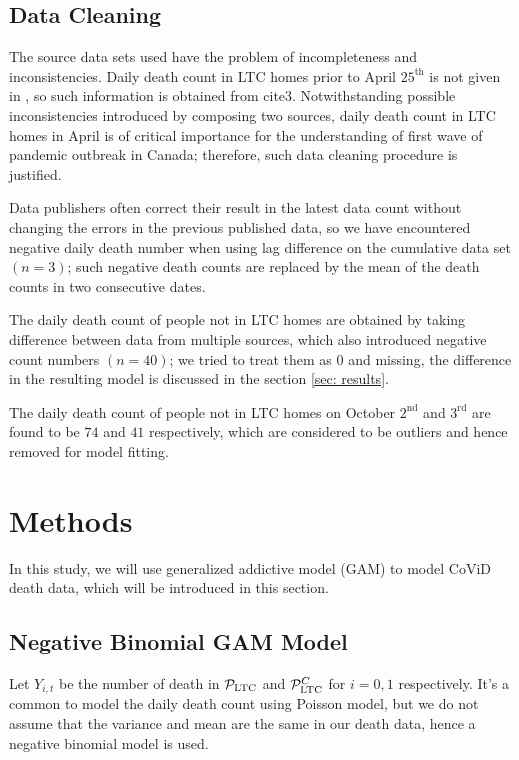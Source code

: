 \documentclass[12pt]{article}
\begin{document}
\subsection{Data Cleaning}
The source data sets used have the problem of incompleteness and inconsistencies. Daily death count in LTC homes prior to
April $25^{\text{th}}$ is not given in \cite{cite2}, so such information is obtained from cite3. Notwithstanding possible inconsistencies
introduced by composing two sources, daily death count in LTC homes in April is of critical importance for the understanding of first
wave of pandemic outbreak in Canada; therefore, such data cleaning procedure is justified.

Data publishers often correct their result in the latest data count without changing the errors in the previous published data, so we have
encountered negative daily death number when using lag difference on the cumulative data set $(n = 3)$; such negative death counts are replaced
by the mean of the death counts in two consecutive dates.

The daily death count of people not in LTC homes are obtained by taking difference between data from multiple sources, which also introduced negative
count numbers $(n =40)$; we tried to treat them as $0$ and missing, the difference in the resulting model is discussed in the section \ref{sec: results}.

The daily death count of people not in LTC homes on October $2 ^{\text{nd}}$ and $3^{\text{rd}}$ are found to be $74$ and $41$ respectively, which are considered to be outliers
and hence removed for model fitting.


\section{Methods}
In this study, we will use generalized addictive model (GAM) to model CoViD death data, which
will be introduced in this section.


\subsection{Negative Binomial GAM Model}


Let $Y_{i,t}$ be the number of death in $\mathcal P_{\mathrm{LTC}}$ and $\mathcal P_{\mathrm{LTC}}^C$ for $i =0,1$ respectively. It's a common to model the daily death count using Poisson model, but we do not  assume that the variance and mean are the same in our death data, hence a negative binomial model is used.
\end{document}
